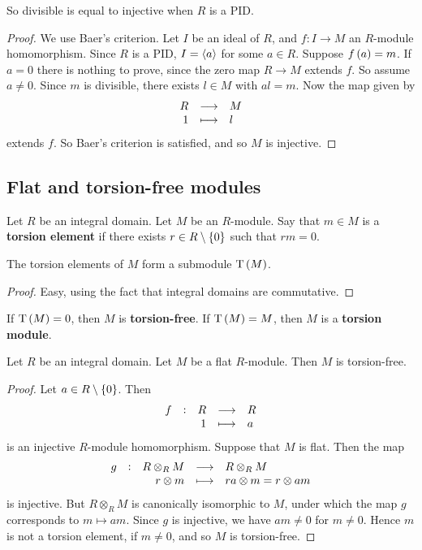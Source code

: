 So divisible is equal to injective when $ R $ is a PID.

\begin{proof}
We use Baer's criterion. Let $ I $ be an ideal of $ R $, and $ f : I \to M $ an $ R $-module homomorphism. Since $ R $ is a PID, $ I = \left\langle a \right\rangle $ for some $ a \in R $. Suppose $ f\br{a} = m $. If $ a = 0 $ there is nothing to prove, since the zero map $ R \to M $ extends $ f $. So assume $ a \ne 0 $. Since $ m $ is divisible, there exists $ l \in M $ with $ al = m $. Now the map given by
$$ \function{R}{M}{1}{l} $$
extends $ f $. So Baer's criterion is satisfied, and so $ M $ is injective.
\end{proof}

\subsection{Flat and torsion-free modules}

\begin{definition}
Let $ R $ be an integral domain. Let $ M $ be an $ R $-module. Say that $ m \in M $ is a \textbf{torsion element} if there exists $ r \in R \setminus \cbr{0} $ such that $ rm = 0 $.
\end{definition}

\begin{proposition}
The torsion elements of $ M $ form a submodule $ \T\br{M} $.
\end{proposition}

\begin{proof}
Easy, using the fact that integral domains are commutative.
\end{proof}

\begin{definition}
If $ \T\br{M} = 0 $, then $ M $ is \textbf{torsion-free}. If $ \T\br{M} = M $, then $ M $ is a \textbf{torsion module}.
\end{definition}

\begin{proposition}
Let $ R $ be an integral domain. Let $ M $ be a flat $ R $-module. Then $ M $ is torsion-free.
\end{proposition}

\begin{proof}
Let $ a \in R \setminus \cbr{0} $. Then
$$ \function[f]{R}{R}{1}{a} $$
is an injective $ R $-module homomorphism. Suppose that $ M $ is flat. Then the map
$$ \function[g]{R \otimes_R M}{R \otimes_R M}{r \otimes m}{ra \otimes m = r \otimes am} $$
is injective. But $ R \otimes_R M $ is canonically isomorphic to $ M $, under which the map $ g $ corresponds to $ m \mapsto am $. Since $ g $ is injective, we have $ am \ne 0 $ for $ m \ne 0 $. Hence $ m $ is not a torsion element, if $ m \ne 0 $, and so $ M $ is torsion-free.
\end{proof}

